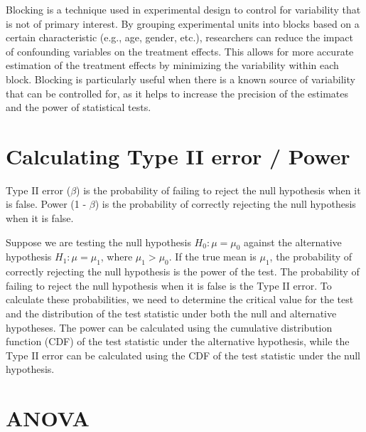 \documentclass[answers,12pt,addpoints]{exam}
\begin{document}
\begin{remark}
    Blocking is a technique used in experimental design to control for variability that is not of primary interest. By grouping experimental units into blocks based on a certain characteristic (e.g., age, gender, etc.), researchers can reduce the impact of confounding variables on the treatment effects. This allows for more accurate estimation of the treatment effects by minimizing the variability within each block. Blocking is particularly useful when there is a known source of variability that can be controlled for, as it helps to increase the precision of the estimates and the power of statistical tests.
\end{remark}


\section{Calculating Type II error / Power}

\begin{definition}
    Type II error ($\beta$) is the probability of failing to reject the null hypothesis when it is false. Power (1 - $\beta$) is the probability of correctly rejecting the null hypothesis when it is false.
\end{definition}

\begin{example}
    Suppose we are testing the null hypothesis $H_0: \mu = \mu_0$ against the alternative hypothesis $H_1: \mu = \mu_1$, where $\mu_1 > \mu_0$. If the true mean is $\mu_1$, the probability of correctly rejecting the null hypothesis is the power of the test. The probability of failing to reject the null hypothesis when it is false is the Type II error. To calculate these probabilities, we need to determine the critical value for the test and the distribution of the test statistic under both the null and alternative hypotheses. The power can be calculated using the cumulative distribution function (CDF) of the test statistic under the alternative hypothesis, while the Type II error can be calculated using the CDF of the test statistic under the null hypothesis.
\end{example}

\section{ANOVA}
\end{document}
